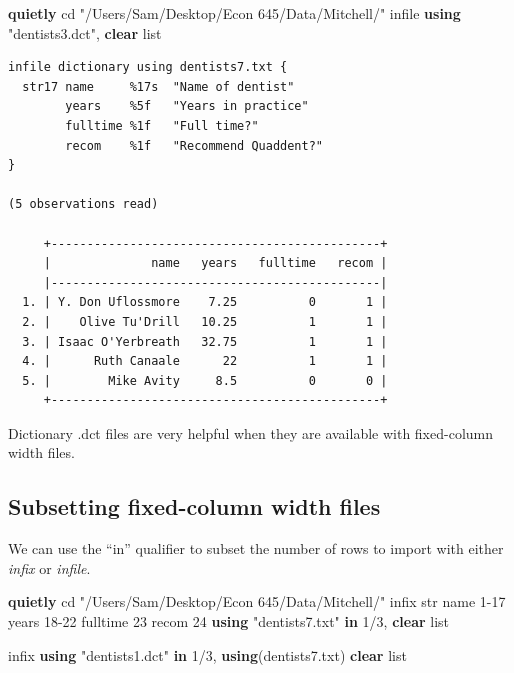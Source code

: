\documentclass[
]{book}
\newenvironment{Shaded}{\begin{snugshade}}{\end{snugshade}}
\newcommand{\BaseNTok}[1]{\textcolor[rgb]{0.00,0.00,0.81}{#1}}
\newcommand{\KeywordTok}[1]{\textcolor[rgb]{0.13,0.29,0.53}{\textbf{#1}}}
\newcommand{\NormalTok}[1]{#1}
\newcommand{\OtherTok}[1]{\textcolor[rgb]{0.56,0.35,0.01}{#1}}
\newcommand{\StringTok}[1]{\textcolor[rgb]{0.31,0.60,0.02}{#1}}
\begin{document}
\begin{Shaded}
\begin{Highlighting}[]
\KeywordTok{quietly}\NormalTok{ cd }\StringTok{"/Users/Sam/Desktop/Econ 645/Data/Mitchell/"}
\NormalTok{infile }\KeywordTok{using} \StringTok{"dentists3.dct"}\NormalTok{, }\KeywordTok{clear}
\OtherTok{list}
\end{Highlighting}
\end{Shaded}

\begin{verbatim}
infile dictionary using dentists7.txt {
  str17 name     %17s  "Name of dentist"
        years    %5f   "Years in practice"
        fulltime %1f   "Full time?"
        recom    %1f   "Recommend Quaddent?"
}

(5 observations read)

     +----------------------------------------------+
     |              name   years   fulltime   recom |
     |----------------------------------------------|
  1. | Y. Don Uflossmore    7.25          0       1 |
  2. |    Olive Tu'Drill   10.25          1       1 |
  3. | Isaac O'Yerbreath   32.75          1       1 |
  4. |      Ruth Canaale      22          1       1 |
  5. |        Mike Avity     8.5          0       0 |
     +----------------------------------------------+
\end{verbatim}

Dictionary .dct files are very helpful when they are available with fixed-column width files.

\subsection{Subsetting fixed-column width files}\label{subsetting-fixed-column-width-files}

We can use the ``in'' qualifier to subset the number of rows to import with either \emph{infix} or \emph{infile}.

\begin{Shaded}
\begin{Highlighting}[]
\KeywordTok{quietly}\NormalTok{ cd }\StringTok{"/Users/Sam/Desktop/Econ 645/Data/Mitchell/"}
\NormalTok{infix str }\BaseNTok{name}\NormalTok{ 1{-}17 years 18{-}22 fulltime 23 recom 24 }\KeywordTok{using} \StringTok{"dentists7.txt"} \KeywordTok{in}\NormalTok{ 1/3, }\KeywordTok{clear}
\OtherTok{list}

\NormalTok{infix }\KeywordTok{using} \StringTok{"dentists1.dct"} \KeywordTok{in}\NormalTok{ 1/3, }\KeywordTok{using}\NormalTok{(dentists7.txt) }\KeywordTok{clear}
\OtherTok{list}
\end{Highlighting}
\end{Shaded}
\end{document}
